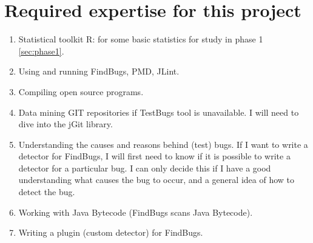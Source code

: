 \documentclass{uvamscse}
\begin{document}
\section{Required expertise for this project}

\begin{enumerate}
	\item Statistical toolkit R: for some basic statistics for study in phase 1 \ref{sec:phase1}.
	\item Using and running FindBugs, PMD, JLint.
	\item Compiling open source programs.
	\item Data mining GIT repositories if TestBugs tool is unavailable. I will need to dive into the jGit library. 
	\item Understanding the causes and reasons behind (test) bugs. If I want to write a detector for FindBugs, I will first need to know if it is possible to write a detector for a particular bug. I can only decide this if I have a good understanding what causes the bug to occur, and a general idea of how to detect the bug. 
	\item Working with Java Bytecode (FindBugs scans Java Bytecode). 
	\item Writing a plugin (custom detector) for FindBugs.
	
\end{enumerate}
\end{document}
